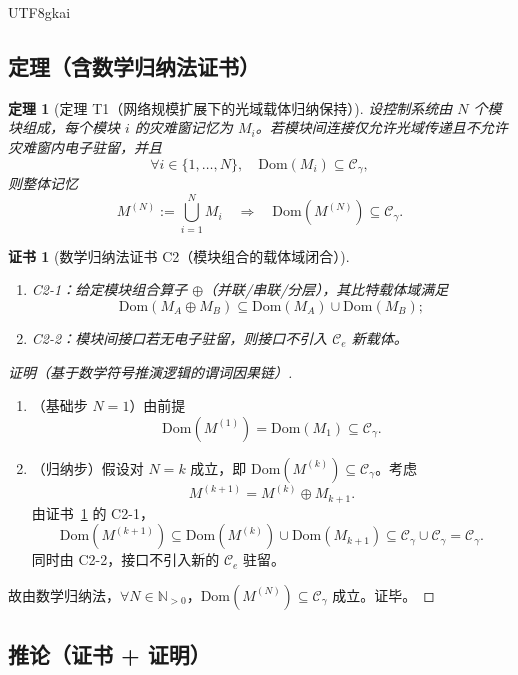 \documentclass[12pt]{article}
\newtheorem{theorem}{定理}[section]
\newtheorem{Certificate}{证书}[section]
\newcommand{\NN}{\mathbb{N}}
\begin{document}
\begin{CJK*}{UTF8}{gkai}
\subsection{定理（含数学归纳法证书）}
\label{subsec:tex27-ch16b-theorem}

\begin{theorem}[定理 T1（网络规模扩展下的光域载体归纳保持）]
\label{thm:tex27-ch16b-t1}
设控制系统由 $N$ 个模块组成，每个模块 $i$ 的灾难窗记忆为 $M_i$。若模块间连接仅允许光域传递且不允许灾难窗内电子驻留，并且
\[
  \forall i\in\{1,\dots,N\},\quad
  \mathrm{Dom}(M_i)\subseteq\mathcal{C}_{\gamma},
\]
则整体记忆
\[
  M^{(N)}:=\bigcup_{i=1}^{N}M_i
  \quad\Rightarrow\quad
  \mathrm{Dom}(M^{(N)})\subseteq\mathcal{C}_{\gamma}.
\]
\end{theorem}

\begin{Certificate}[数学归纳法证书 C2（模块组合的载体域闭合）]
\label{cert:tex27-ch16b-c2}
\begin{enumerate}
  \item C2-1：给定模块组合算子 $\oplus$（并联/串联/分层），其比特载体域满足
  \[
    \mathrm{Dom}(M_A\oplus M_B)\subseteq
    \mathrm{Dom}(M_A)\cup\mathrm{Dom}(M_B);
  \]
  \item C2-2：模块间接口若无电子驻留，则接口不引入 $\mathcal{C}_{e}$ 新载体。
\end{enumerate}
\end{Certificate}

\begin{proof}[证明（基于数学符号推演逻辑的谓词因果链）]
\begin{enumerate}
  \item（基础步 $N=1$）由前提
  \[
    \mathrm{Dom}(M^{(1)})=\mathrm{Dom}(M_1)\subseteq\mathcal{C}_{\gamma}.
  \]
  \item（归纳步）假设对 $N=k$ 成立，即 $\mathrm{Dom}(M^{(k)})\subseteq\mathcal{C}_{\gamma}$。考虑
  \[
    M^{(k+1)}=M^{(k)}\oplus M_{k+1}.
  \]
  由证书~\ref{cert:tex27-ch16b-c2} 的 C2-1，
  \[
    \mathrm{Dom}(M^{(k+1)})
    \subseteq
    \mathrm{Dom}(M^{(k)})\cup\mathrm{Dom}(M_{k+1})
    \subseteq
    \mathcal{C}_{\gamma}\cup\mathcal{C}_{\gamma}
    =\mathcal{C}_{\gamma}.
  \]
  同时由 C2-2，接口不引入新的 $\mathcal{C}_e$ 驻留。
\end{enumerate}
故由数学归纳法，$\forall N\in\NN_{>0}$，$\mathrm{Dom}(M^{(N)})\subseteq\mathcal{C}_{\gamma}$ 成立。证毕。
\end{proof}

\subsection{推论（证书 + 证明）}
\label{subsec:tex27-ch16b-cor}


\end{CJK*}
\end{document}
